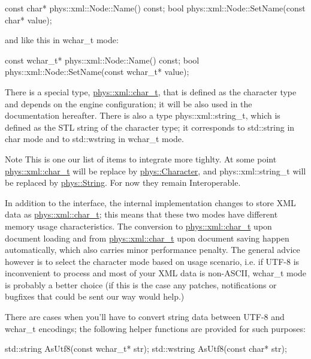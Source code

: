 \begin{DoxyCode}
 const char* phys::xml::Node::Name() const;
 bool phys::xml::Node::SetName(const char* value);
\end{DoxyCode}
 and like this in wchar\_\-t mode: 
\begin{DoxyCode}
 const wchar_t* phys::xml::Node::Name() const;
 bool phys::xml::Node::SetName(const wchar_t* value);
\end{DoxyCode}
 There is a special type, \hyperlink{namespacephys_1_1xml_afc87705cd1c2917d87b879715a2d8f6e}{phys::xml::char\_\-t}, that is defined as the character type and depends on the engine configuration; it will be also used in the documentation hereafter. There is also a type phys::xml::string\_\-t, which is defined as the STL string of the character type; it corresponds to std::string in char mode and to std::wstring in wchar\_\-t mode. \begin{DoxyNote}{Note}
This is one our list of items to integrate more tighlty. At some point \hyperlink{namespacephys_1_1xml_afc87705cd1c2917d87b879715a2d8f6e}{phys::xml::char\_\-t} will be replace by \hyperlink{namespacephys_a3098bae5b0a3cd16eec331f766cc562b}{phys::Character}, and phys::xml::string\_\-t will be replaced by \hyperlink{namespacephys_aa03900411993de7fbfec4789bc1d392e}{phys::String}. For now they remain Interoperable.
\end{DoxyNote}
In addition to the interface, the internal implementation changes to store XML data as \hyperlink{namespacephys_1_1xml_afc87705cd1c2917d87b879715a2d8f6e}{phys::xml::char\_\-t}; this means that these two modes have different memory usage characteristics. The conversion to \hyperlink{namespacephys_1_1xml_afc87705cd1c2917d87b879715a2d8f6e}{phys::xml::char\_\-t} upon document loading and from \hyperlink{namespacephys_1_1xml_afc87705cd1c2917d87b879715a2d8f6e}{phys::xml::char\_\-t} upon document saving happen automatically, which also carries minor performance penalty. The general advice however is to select the character mode based on usage scenario, i.e. if UTF-\/8 is inconvenient to process and most of your XML data is non-\/ASCII, wchar\_\-t mode is probably a better choice (if this is the case any patches, notifications or bugfixes that could be sent our way would help.) \par
 \par
 There are cases when you'll have to convert string data between UTF-\/8 and wchar\_\-t encodings; the following helper functions are provided for such purposes: 
\begin{DoxyCode}
 std::string AsUtf8(const wchar_t* str);
 std::wstring AsUtf8(const char* str);
\end{DoxyCode}
